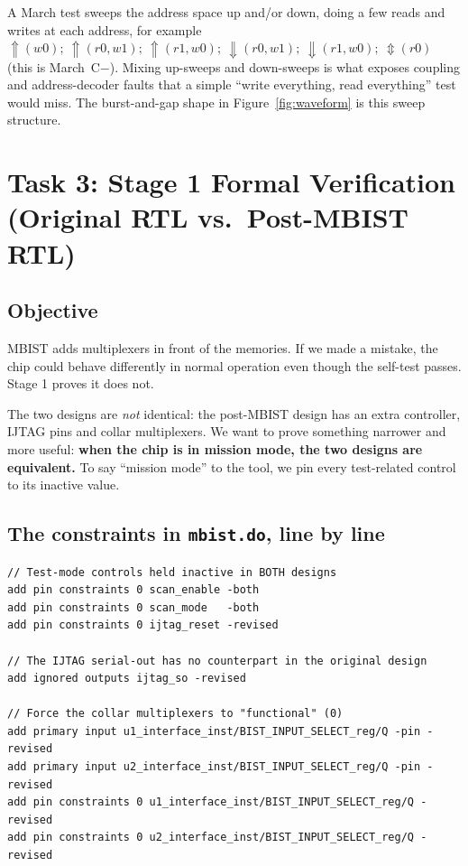 \documentclass[11pt]{article}
\newcommand{\code}[1]{\texttt{\small #1}}
\begin{document}
\begin{keybox}
A March test sweeps the address space up and/or down, doing a few reads and writes at each address, for example
$\Uparrow(w0);\ \Uparrow(r0,w1);\ \Uparrow(r1,w0);\ \Downarrow(r0,w1);\ \Downarrow(r1,w0);\ \Updownarrow(r0)$ (this is March~C$-$).
Mixing up-sweeps and down-sweeps is what exposes coupling and address-decoder faults that a simple
``write everything, read everything'' test would miss. The burst-and-gap shape in Figure~\ref{fig:waveform} is this sweep structure.
\end{keybox}

\section{Task 3: Stage 1 Formal Verification (Original RTL vs.\ Post-MBIST RTL)}

\subsection{Objective}
MBIST adds multiplexers in front of the memories. If we made a mistake, the chip could behave differently
in normal operation even though the self-test passes. Stage 1 proves it does not.

\begin{whybox}
The two designs are \emph{not} identical: the post-MBIST design has an extra controller, IJTAG pins and
collar multiplexers. We want to prove something narrower and more useful:
\textbf{when the chip is in mission mode, the two designs are equivalent.}
To say ``mission mode'' to the tool, we pin every test-related control to its inactive value.
\end{whybox}

\subsection{The constraints in \code{mbist.do}, line by line}
\begin{lstlisting}[language=LECTcl, caption={Stage 1 constraints}]
// Test-mode controls held inactive in BOTH designs
add pin constraints 0 scan_enable -both
add pin constraints 0 scan_mode   -both
add pin constraints 0 ijtag_reset -revised

// The IJTAG serial-out has no counterpart in the original design
add ignored outputs ijtag_so -revised

// Force the collar multiplexers to "functional" (0)
add primary input u1_interface_inst/BIST_INPUT_SELECT_reg/Q -pin -revised
add primary input u2_interface_inst/BIST_INPUT_SELECT_reg/Q -pin -revised
add pin constraints 0 u1_interface_inst/BIST_INPUT_SELECT_reg/Q -revised
add pin constraints 0 u2_interface_inst/BIST_INPUT_SELECT_reg/Q -revised
\end{lstlisting}
\end{document}

